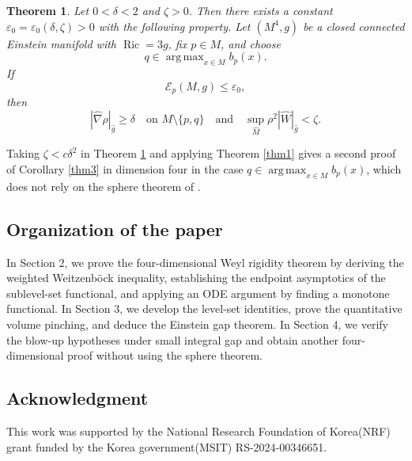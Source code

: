 \documentclass[11pt]{amsart}
\theoremstyle{plain}
\newtheorem{theorem}{Theorem}[section]
\numberwithin{equation}{section}
\newcommand{\ve}{\varepsilon}
\newcommand{\E}{\mathcal{E}}
\newcommand{\wh}[1]{\widehat{#1}}
\DeclareMathOperator{\ric}{Ric}
\DeclareMathOperator*{\argmax}{arg\,max}
\newcommand{\hn}{\widehat{\nabla}}
\newcommand{\hg}{\widehat{g}}
\newcommand{\hm}{\widehat{M}}
\begin{document}
\begin{theorem}\label{thm4}
Let $0<\delta<2$ and $\zeta>0$. Then there exists a constant $\ve_0=\ve_0(\delta,\zeta)>0$ with the following property. Let $(M^4,g)$ be a closed connected Einstein manifold with $\ric=3g$, fix $p\in M$, and choose 
\begin{equation*}
q\in\argmax_{x\in M}b_p(x).
\end{equation*}
If
\begin{equation*}
\E_p(M,g)\le\ve_0,
\end{equation*}
then
\begin{equation*}
|\hn\rho|_{\hg}\ge\delta\quad\text{on $M\setminus\{p,q\}$}\quad\text{and}\quad\sup_{\hm}\rho^2|\wh{W}|_{\hg}<\zeta.
\end{equation*}
\end{theorem}

Taking $\zeta<c\delta^2$ in Theorem \ref{thm4} and applying Theorem \ref{thm1} gives a second proof of Corollary \ref{thm3} in dimension four in the case $q\in\argmax_{x\in M}b_p(x)$, which does not rely on the sphere theorem of \cite{HondaMondello}.

\subsection*{Organization of the paper}
In Section 2, we prove the four-dimensional Weyl rigidity theorem by deriving the weighted Weitzenb\"ock inequality, establishing the endpoint asymptotics of the sublevel-set functional, and applying an ODE argument by finding a monotone functional. In Section 3, we develop the level-set identities, prove the quantitative volume pinching, and deduce the Einstein gap theorem. In Section 4, we verify the blow-up hypotheses under small integral gap and obtain another four-dimensional proof without using the sphere theorem.

\subsection*{Acknowledgment} This work was supported by the National Research Foundation of Korea(NRF) grant funded by the Korea government(MSIT) RS-2024-00346651. 
\end{document}
